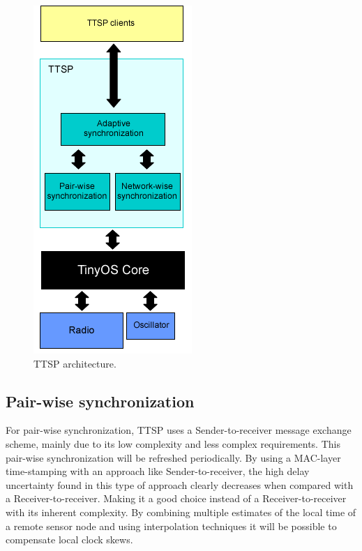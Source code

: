 \begin{figure}[!htb]
\begin{center}
\includegraphics[scale=0.5]{./images/05-ttsp-design_goals.png}
\end{center}
\caption{TTSP architecture.}
\label{ttsparch}
\end{figure}

\subsection{Pair-wise synchronization}
For pair-wise synchronization, TTSP uses a Sender-to-receiver message exchange scheme, mainly due to its low complexity and less complex requirements. This pair-wise synchronization will be refreshed periodically. By using a MAC-layer time-stamping with an approach like Sender-to-receiver, the high delay uncertainty found in this type of approach clearly decreases when compared with a Receiver-to-receiver. Making it a good choice instead of a Receiver-to-receiver with its inherent complexity.  By combining multiple estimates of the local time of a remote sensor node and using interpolation techniques it will be possible to compensate local clock skews.

